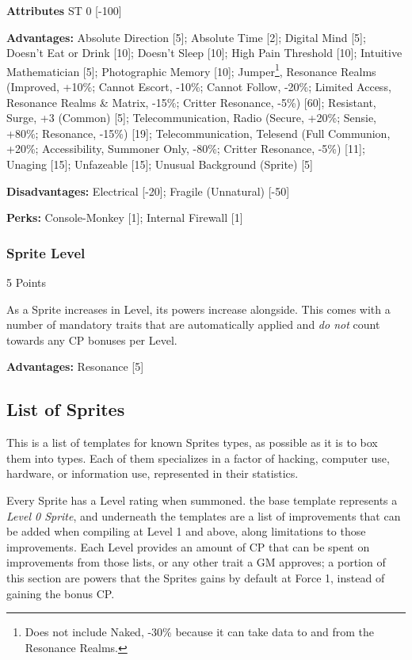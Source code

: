 \begin{multicols*}{3}
\textbf{Attributes}
ST 0 [-100]

\textbf{Advantages:}
Absolute Direction [5]; Absolute Time [2]; Digital Mind [5]; Doesn't Eat or Drink [10]; Doesn't Sleep [10]; High Pain Threshold [10]; Intuitive Mathematician [5]; Photographic Memory [10]; Jumper\footnote{Does not include Naked, -30\% because it can take data to and from the Resonance Realms.}, Resonance Realms (Improved, +10\%; Cannot Escort, -10\%; Cannot Follow, -20\%; Limited Access, Resonance Realms \& Matrix, -15\%; Critter Resonance, -5\%) [60];  Resistant, Surge, +3 (Common) [5]; Telecommunication, Radio (Secure, +20\%; Sensie, +80\%; Resonance, -15\%) [19]; Telecommunication, Telesend (Full Communion, +20\%; Accessibility, Summoner Only, -80\%; Critter Resonance, -5\%) [11]; Unaging [15]; Unfazeable [15]; Unusual Background (Sprite) [5]

\textbf{Disadvantages:}
Electrical [-20]; Fragile (Unnatural) [-50]

\textbf{Perks:}
Console-Monkey [1]; Internal Firewall [1]

\subsubsection{Sprite Level}\label{sprite_level}
\begin{flushright}
	5 Points
\end{flushright}

As a Sprite increases in Level, its powers increase alongside. This comes with a number of mandatory traits that are automatically applied and \textit{do not} count towards any CP bonuses per Level.

\textbf{Advantages:}
Resonance [5]

\subsection{List of Sprites}

This is a list of templates for known Sprites types, as possible as it is to box them into types. Each of them specializes in a factor of hacking, computer use, hardware, or information use, represented in their statistics.

Every Sprite has a Level rating when summoned. the base template represents a \textit{Level 0 Sprite}, and underneath the templates are a list of improvements that can be added when compiling at Level 1 and above, along limitations to those improvements. Each Level provides an amount of CP that can be spent on improvements from those lists, or any other trait a GM approves; a portion of this section are powers that the Sprites gains by default at Force 1, instead of gaining the bonus CP. 


\end{multicols*}
